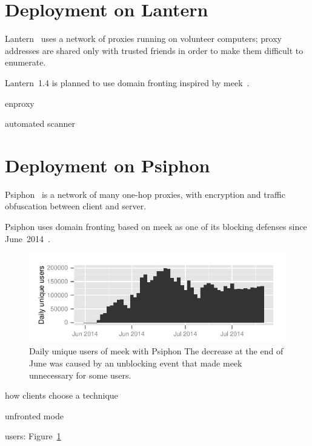 \documentclass{sig-alternate}
\newcommand{\meekclient}{\mbox{meek-client}\xspace}
\newcommand{\meek}{meek\xspace}
\begin{document}
\section{Deployment on Lantern}
\label{sec:deploy-lantern}

Lantern~\cite{lantern} uses a network of proxies running on volunteer computers;
proxy addresses are shared only with trusted friends in order to make them difficult to enumerate.

Lantern~1.4 is planned to use domain fronting inspired by \meek~\cite{lantern-1.3.1}.

enproxy

automated scanner


\section{Deployment on Psiphon}
\label{sec:deploy-psiphon}

Psiphon~\cite{psiphon} is a network of many one-hop proxies,
with encryption and traffic obfuscation between client and server.

Psiphon uses domain fronting based on \meek as one of its blocking defenses since June~2014~\cite{psiphon-meek-merge}.

\begin{figure}
\includegraphics[width=\linewidth]{clients-psiphon3}
\caption{
Daily unique users of \meek with
Psiphon
The decrease at the end of June
was caused by an unblocking event that made \meek unnecessary for some users.
}
\label{fig:clients-psiphon3}
\end{figure}

how clients choose a technique

unfronted mode

users: Figure~\ref{fig:clients-psiphon3}

\end{document}
